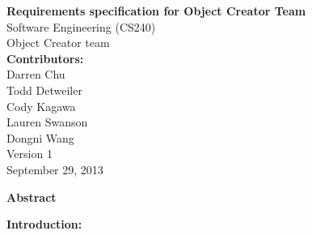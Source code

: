 \documentclass[12pt]{report}
\begin{document}
\begin{center}
{\bf\huge Requirements specification for Object Creator Team}
\\[3\baselineskip]
{\large Software Engineering (CS240)}
\\[2\baselineskip]
{\large Object Creator team}
\\[2\baselineskip]
{\bf Contributors: }\\
Darren Chu \\ Todd Detweiler \\ Cody Kagawa \\  Lauren Swanson \\  Dongni Wang 
\\[8\baselineskip]
Version 1\\
September 29, 2013 
\end{center} 
\pagebreak

\begin{center}
{\bf\large Abstract \\[1\baselineskip] }
{\it



}
\end{center}
\pagebreak

{\bf\large Introduction: \\[1\baselineskip] }

\pagebreak
\end{document}
